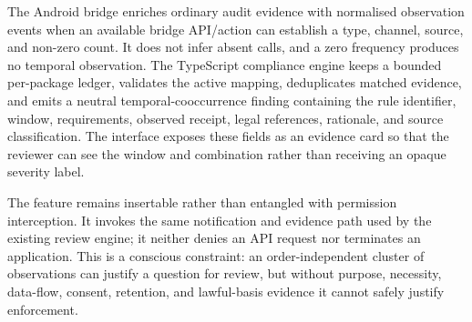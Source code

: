 The Android bridge enriches ordinary audit evidence with normalised observation events when an available bridge API/action can establish a type, channel, source, and non-zero count. It does not infer absent calls, and a zero frequency produces no temporal observation. The TypeScript compliance engine keeps a bounded per-package ledger, validates the active mapping, deduplicates matched evidence, and emits a neutral temporal-cooccurrence finding containing the rule identifier, window, requirements, observed receipt, legal references, rationale, and source classification. The interface exposes these fields as an evidence card so that the reviewer can see the window and combination rather than receiving an opaque severity label.

The feature remains insertable rather than entangled with permission interception. It invokes the same notification and evidence path used by the existing review engine; it neither denies an API request nor terminates an application. This is a conscious constraint: an order-independent cluster of observations can justify a question for review, but without purpose, necessity, data-flow, consent, retention, and lawful-basis evidence it cannot safely justify enforcement.
